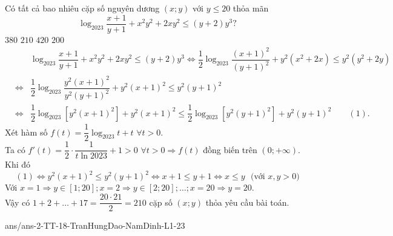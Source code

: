 \begin{ex}%
Có tất cả bao nhiêu cặp số nguyên dương $(x;y)$ với $y\le 20$ thỏa mãn $$\log_{2023}\dfrac{x+1}{y+1}+x^2y^2+2xy^2\le (y+2)y^3?$$
\choice 
{$380$} 
{\True $210$}
{$420$} 
{$200$}
\loigiai
{
\begin{eqnarray*}
&&\log_{2023}\dfrac{x+1}{y+1}+x^2y^2+2xy^2\le (y+2)y^3\Leftrightarrow \dfrac{1}{2}\log_{2023}\dfrac{(x+1)^2}{(y+1)^2}+y^2\left (x^2+2x \right )\le y^2\left (y^2+2y \right )\\
&\Leftrightarrow &\dfrac{1}{2}\log_{2023}\dfrac{y^2(x+1)^2}{y^2(y+1)^2}+y^2(x+1)^2\le y^2(y+1)^2\\
&\Leftrightarrow &\dfrac{1}{2}\log_{2023}\left [y^2(x+1)^2 \right ]+y^2(x+1)^2\le\dfrac{1}{2}\log_{2023}\left [y^2(y+1)^2 \right ]+y^2(y+1)^2\quad\quad (1).
\end{eqnarray*}
Xét hàm số $f(t)=\dfrac{1}{2}\log_{2023}t+t\,\,\forall t>0$.\\
Ta có $f'(t)=\dfrac{1}{2}\cdot\dfrac{1}{t\ln 2023}+1>0\,\,\forall t>0\Rightarrow f(t)$ đồng biến trên $(0;+\infty )$. Khi đó $$(1)\Leftrightarrow y^2(x+1)^2\le y^2(y+1)^2\Leftrightarrow x+1\le y+1\Leftrightarrow x\le y\,\,\text{ (với }x,y>0)$$
Với $x=1\Rightarrow y\in[1;20];x=2\Rightarrow y\in [2;20];\ldots ;x=20\Rightarrow y=20$.\\
Vậy có $1+2+\ldots +17=\dfrac{20\cdot 21}{2}=210$ cặp số $(x;y)$ thỏa yêu cầu bài toán.
}
\end{ex}

\begin{indapan}{10}
	{ans/ans-2-TT-18-TranHungDao-NamDinh-L1-23}
\end{indapan}

